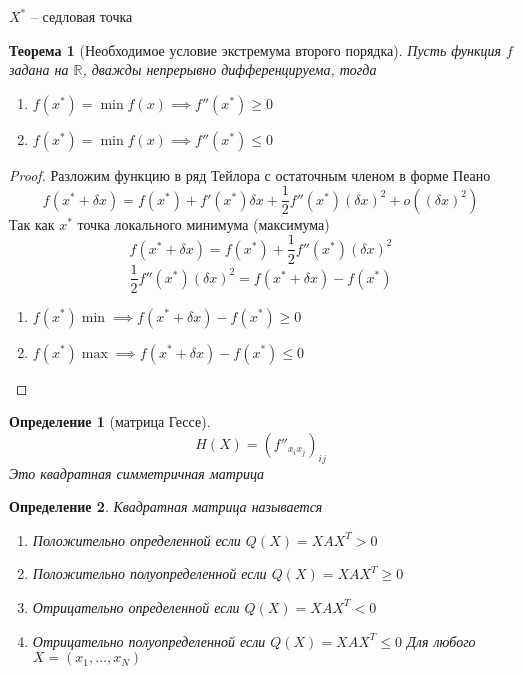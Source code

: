 \documentclass[14pt]{extarticle}
\newtheorem{theorem}{Теорема}
\newtheorem{definiiton}{Определение}
\begin{document}
	$X^{*}$ -- седловая точка
	\begin{theorem}[Необходимое условие экстремума второго порядка]
		Пусть функция $f$ задана на  $\mathbb{R}$, дважды непрерывно дифференцируема,
		тогда
		\begin{enumerate}
			\item $f(x^{*}) = \min f(x) \implies f''(x^{*}) \ge  0$
			\item $f(x^{*}) = \min f(x) \implies f''(x^{*}) \le  0$
		\end{enumerate}
\end{theorem}
\begin{proof}
	Разложим функцию в ряд Тейлора с остаточным членом в форме Пеано
	\begin{equation}
		f(x^{*} + \delta x) = f(x^{*}) + f'(x^{*}) \delta x + \frac{1}{2} f''(x^{*}) (\delta x)^2 + o((\delta x) ^2)
	\end{equation}
	Так как $x^{*}$ точка локального минимума (максимума)
	\begin{equation}
		f(x^{*} + \delta x) = f(x^{*}) + \frac{1}{2} f''(x^{*}) ( \delta x )^2
	\end{equation}
	\begin{equation}
		\frac{1}{2} f''(x^{*}) (\delta x) ^2 = f(x^{*} + \delta x) - f(x^{*})
	\end{equation}
	\begin{enumerate}
		\item $f(x^{*}) \min \implies f(x^{*} + \delta x) -f(x^{*}) \ge 0$ 
		\item $f(x^{*}) \max \implies f(x^{*} + \delta x) -f(x^{*}) \le  0$
	\end{enumerate}
\end{proof}
\begin{definiiton}[матрица Гессе]
	\begin{equation}
		H(X) = (f''_{x_{i} x_{j}})_{ij}
	\end{equation}
	Это квадратная симметричная матрица
\end{definiiton}
\begin{definiiton}
	Квадратная матрица называется
	\begin{enumerate}
		\item Положительно определенной
			если $Q(X) = X A X^{T} > 0$
		\item Положительно полуопределенной
			если $Q(X) = X A X^{T} \ge  0$
		\item Отрицательно определенной
			если $Q(X) = X A X^{T} <  0$
		\item Отрицательно полуопределенной
			если $Q(X) = X A X^{T} \le   0$
	Для любого $X = (x_1,\dots,x_{N})$
	\end{enumerate}
\end{definiiton}
\end{document}
